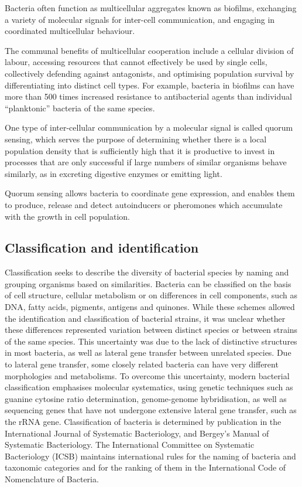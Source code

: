 Bacteria often function as multicellular aggregates known as biofilms, exchanging a variety of molecular signals for inter-cell communication, and engaging in coordinated multicellular behaviour.

The communal benefits of multicellular cooperation include a cellular division of labour, accessing resources that cannot effectively be used by single cells, collectively defending against antagonists, and optimising population survival by differentiating into distinct cell types. For example, bacteria in biofilms can have more than 500 times increased resistance to antibacterial agents than individual ``planktonic'' bacteria of the same species.

One type of inter-cellular communication by a molecular signal is called quorum sensing, which serves the purpose of determining whether there is a local population density that is sufficiently high that it is productive to invest in processes that are only successful if large numbers of similar organisms behave similarly, as in excreting digestive enzymes or emitting light.

Quorum sensing allows bacteria to coordinate gene expression, and enables them to produce, release and detect autoinducers or pheromones which accumulate with the growth in cell population.

\hypertarget{classification-and-identification}{%
\subsection{Classification and identification}\label{classification-and-identification}}

Classification seeks to describe the diversity of bacterial species by naming and grouping organisms based on similarities. Bacteria can be classified on the basis of cell structure, cellular metabolism or on differences in cell components, such as DNA, fatty acids, pigments, antigens and quinones. While these schemes allowed the identification and classification of bacterial strains, it was unclear whether these differences represented variation between distinct species or between strains of the same species. This uncertainty was due to the lack of distinctive structures in most bacteria, as well as lateral gene transfer between unrelated species. Due to lateral gene transfer, some closely related bacteria can have very different morphologies and metabolisms. To overcome this uncertainty, modern bacterial classification emphasises molecular systematics, using genetic techniques such as guanine cytosine ratio determination, genome-genome hybridisation, as well as sequencing genes that have not undergone extensive lateral gene transfer, such as the rRNA gene. Classification of bacteria is determined by publication in the International Journal of Systematic Bacteriology, and Bergey's Manual of Systematic Bacteriology. The International Committee on Systematic Bacteriology (ICSB) maintains international rules for the naming of bacteria and taxonomic categories and for the ranking of them in the International Code of Nomenclature of Bacteria.

